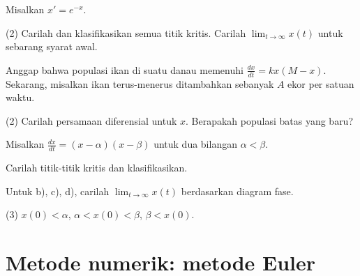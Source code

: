 \begin{exercise}
Misalkan $x'=e^{-x}$.
\begin{tasks}(2)
\task Carilah dan klasifikasikan semua titik kritis.
\task Carilah $\displaystyle \lim_{t\to\infty} x(t)$ untuk sebarang
syarat awal.
\end{tasks}
\end{exercise}

\begin{exercise}
Anggap bahwa populasi ikan di suatu danau memenuhi
$\frac{dx}{dt} = kx(M-x)$.  Sekarang, misalkan ikan terus-menerus ditambahkan
sebanyak $A$ ekor per satuan waktu.
\begin{tasks}(2)
\task Carilah persamaan diferensial untuk $x$.
\task Berapakah populasi batas yang baru?
\end{tasks}
\end{exercise}

\begin{exercise}
Misalkan $\frac{dx}{dt} = (x-\alpha)(x-\beta)$ untuk dua bilangan $\alpha <
\beta$.
\begin{tasks}
\task Carilah titik-titik kritis dan klasifikasikan.
\end{tasks}
Untuk b), c), d), carilah $\displaystyle \lim_{t\to\infty} x(t)$ berdasarkan
diagram fase.
\begin{tasks}[resume](3)
\task $x(0) < \alpha$,
\task $\alpha < x(0) < \beta$,
\task $\beta < x(0)$.
\end{tasks}
\end{exercise}


\sectionnewpage
\section{Metode numerik: metode Euler}
\label{numer:section}


%

